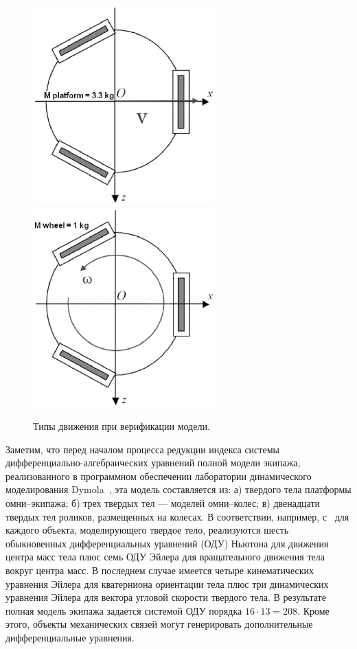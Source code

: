 \documentclass[12pt,a4paper]{article}
\begin{document}
\begin{figure}[htb]
\centerline{
\includegraphics[width=7cm]{Translat.eps}
\includegraphics[width=7cm]{Rotat.eps}
}
\caption{Типы движения при верификации модели.}
\label{TypesOfMotion}
\end{figure}

Заметим, что перед началом процесса редукции индекса системы 
дифференциально-алгебраических уравнений полной модели экипажа, реализованного
в программном обеспечении лаборатории динамического моделирования 
Dymola~\cite{Dymola}, эта модель составляется из: а) твердого тела платформы
омни--экипажа; б) трех твердых тел --- моделей омни--колес; в) двенадцати 
твердых тел роликов, размещенных на колесах. В соответствии, например, 
с~\cite{Kosenko2007} для каждого объекта, моделирующего твердое тело, 
реализуются шесть обыкновенных дифференциальных уравнений (ОДУ) Ньютона для
движения центра масс тела плюс семь ОДУ Эйлера для вращательного движения тела
вокруг центра масс. В последнем случае имеется четыре кинематических уравнения
Эйлера для кватерниона ориентации тела плюс три динамических уравнения Эйлера
для вектора угловой скорости твердого тела. В результате полная модель экипажа
задается системой ОДУ порядка $16\cdot 13=208$. Кроме этого, объекты 
механических связей могут генерировать дополнительные дифференциальные 
уравнения.
\end{document}
